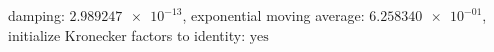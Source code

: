damping: $\num[scientific-notation=true]{2.989247e-13}$, exponential moving average: $\num[scientific-notation=true]{6.258340e-01}$, initialize Kronecker factors to identity: $\text{yes}$